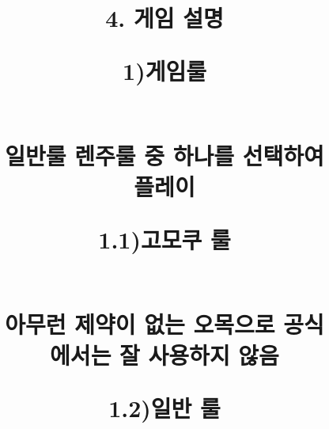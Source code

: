 \documentclass[a4paper, 11pt]{article}
\begin{document}
 \newpage
\title{\textbf{\Huge4. 게임 설명 }
	\vspace{0.5cm}
	
	\textbf{\quad\Large1)게임룰}
	\begin{figure}[h]
		\begin{center}
			\vspace{0.3cm}
			\textbf{\\ 일반룰 렌주룰 중 하나를 선택하여 플레이}
			\vspace{3.2cm}  	
			\begin{flushleft}
			\textbf{\qquad\large1.1)고모쿠 룰}	
			\end{flushleft}
			
			
			\vspace{0.5cm}
			\textbf{\large\\아무런 제약이 없는 오목으로 공식에서는 잘 사용하지 않음}
		
		\end{center}
	\end{figure}
	
	
	
	
	\newpage
	\textbf{\quad\large1.2)일반 룰}
	\begin{figure}[h]
		\begin{center}
			

\end{center}
\end{figure}}
\end{document}
